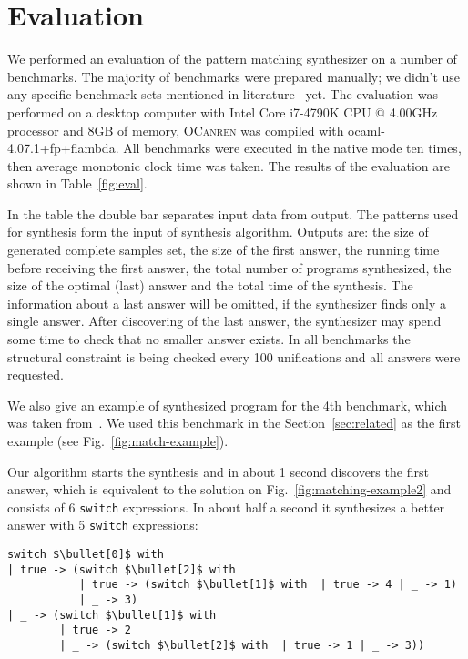 \section{Evaluation}
\label{sec:eval}


We performed an evaluation of the pattern matching synthesizer on a number of benchmarks.
The majority of benchmarks were prepared manually; we didn't use any specific benchmark sets mentioned in literature~\cite{Scott2000WhenDM} yet.
The evaluation was performed on a desktop computer with Intel Core i7-4790K CPU @ 4.00GHz processor and 8GB of memory,
\textsc{OCanren} was compiled with \mbox{ocaml-4.07.1+fp+flambda}. All benchmarks were executed in the native mode ten times,
then average monotonic clock time was taken. The results of the evaluation are shown in Table~\ref{fig:eval}.

In the table the double bar separates input data from output. %
The patterns used for synthesis form the input of synthesis algorithm.
Outputs are: the size of generated complete samples set, the size of the first answer, the running time before receiving the
first answer, the total number of programs synthesized, the size of the optimal (last) answer and the total time of the synthesis. The information about a last answer will be omitted, if the synthesizer finds only a single answer. After discovering of the last answer, the synthesizer may spend some time to check that no smaller answer exists.
In all benchmarks the structural constraint is being checked every 100 unifications and all answers were requested.

We also give an example of synthesized program for the 4th benchmark, which was taken from~\cite{maranget2008}. We used this benchmark in the Section~\ref{sec:related} as the first example (see Fig.~\ref{fig:match-example}).

Our algorithm starts the
synthesis and in about 1 second discovers the first answer, which is equivalent to the solution on Fig.~\ref{fig:matching-example2} and
consists of 6 \lstinline|switch| expressions. In about half a second it synthesizes a better answer with 5 \lstinline|switch| expressions:

\begin{lstlisting}
switch $\bullet[0]$ with
| true -> (switch $\bullet[2]$ with  
           | true -> (switch $\bullet[1]$ with  | true -> 4 | _ -> 1)
           | _ -> 3)
| _ -> (switch $\bullet[1]$ with  
        | true -> 2
        | _ -> (switch $\bullet[2]$ with  | true -> 1 | _ -> 3))
\end{lstlisting}


